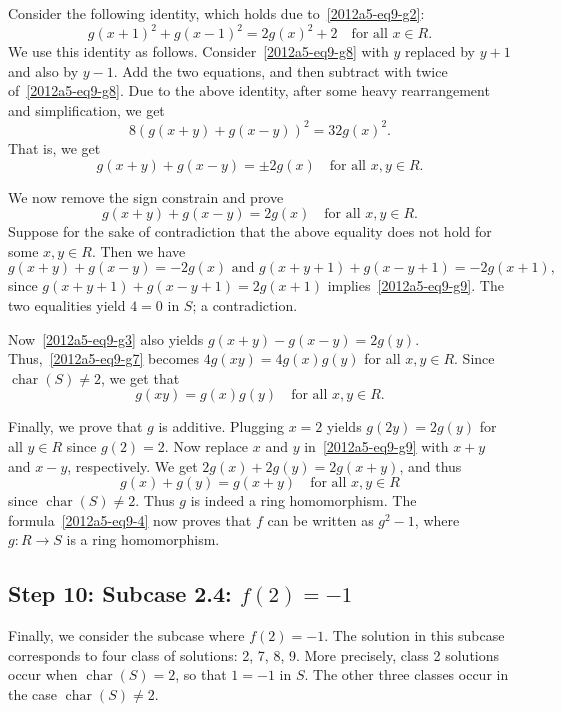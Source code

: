 \documentclass{article}
\DeclareMathOperator{\rchar}{char}
\begin{document}
Consider the following identity, which holds due to~\eqref{2012a5-eq9-g2}:
\[ g(x + 1)^2 + g(x - 1)^2 = 2 g(x)^2 + 2 \quad \text{for all } x \in R. \]
We use this identity as follows.
Consider~\eqref{2012a5-eq9-g8} with $y$ replaced by $y + 1$ and also by $y - 1$.
Add the two equations, and then subtract with twice of~\eqref{2012a5-eq9-g8}.
Due to the above identity, after some heavy rearrangement and simplification, we get
\[ 8 (g(x + y) + g(x - y))^2 = 32 g(x)^2. \]
That is, we get
\[ g(x + y) + g(x - y) = \pm 2 g(x) \quad \text{for all } x, y \in R. \]

We now remove the sign constrain and prove
\[ g(x + y) + g(x - y) = 2 g(x) \quad \text{for all } x, y \in R. \tag{9.g9}\label{2012a5-eq9-g9} \]
Suppose for the sake of contradiction that the above equality does not hold for some $x, y \in R$.
Then we have
\[ g(x + y) + g(x - y) = -2 g(x) \text{ and } g(x + y + 1) + g(x - y + 1) = -2 g(x + 1), \]
    since $g(x + y + 1) + g(x - y + 1) = 2 g(x + 1)$ implies~\eqref{2012a5-eq9-g9}.
The two equalities yield $4 = 0$ in $S$; a contradiction.

Now~\eqref{2012a5-eq9-g3} also yields $g(x + y) - g(x - y) = 2 g(y)$.
Thus,~\eqref{2012a5-eq9-g7} becomes $4 g(xy) = 4 g(x) g(y)$ for all $x, y \in R$.
Since $\rchar(S) \neq 2$, we get that
\[ g(xy) = g(x) g(y) \quad \text{for all } x, y \in R. \tag{9.g10}\label{2012a5-eq9-g10} \]

Finally, we prove that $g$ is additive.
Plugging $x = 2$ yields $g(2y) = 2g(y)$ for all $y \in R$ since $g(2) = 2$.
Now replace $x$ and $y$ in~\eqref{2012a5-eq9-g9} with $x + y$ and $x - y$, respectively.
We get $2 g(x) + 2 g(y) = 2 g(x + y)$, and thus
\[ g(x) + g(y) = g(x + y) \quad \text{for all } x, y \in R \]
    since $\rchar(S) \neq 2$.
Thus $g$ is indeed a ring homomorphism.
The formula~\eqref{2012a5-eq9-4} now proves that $f$ can be written as $g^2 - 1$, where $g : R \to S$ is a ring homomorphism.









\subsection*{Step 10: Subcase 2.4: $f(2) = -1$}

Finally, we consider the subcase where $f(2) = -1$.
The solution in this subcase corresponds to four class of solutions: 2, 7, 8, 9.
More precisely, class 2 solutions occur when $\rchar(S) = 2$, so that $1 = -1$ in $S$.
The other three classes occur in the case $\rchar(S) \neq 2$.
\end{document}
